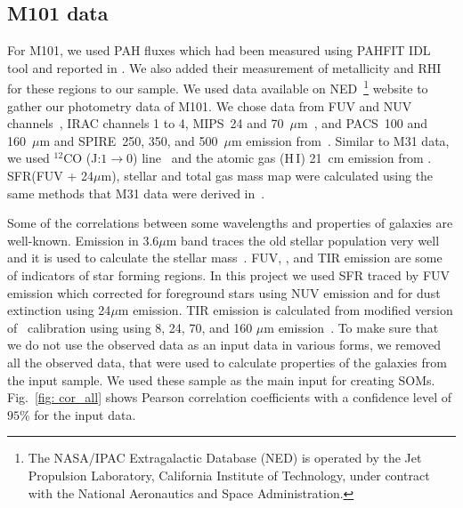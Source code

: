     \subsection{M101 data}
    \label{Sec: data_M101_SOMN} 
     For M101, we used PAH fluxes which had been measured using {\sc PAHFIT IDL} tool and reported in \cite{Gordon08}.
     We also added their measurement of metallicity and RHI for these regions to our sample.
     We used data available on NED~\footnote{The NASA/IPAC Extragalactic Database (NED) is operated by the Jet Propulsion Laboratory, California Institute of Technology, under contract with the National Aeronautics and Space Administration.} website to gather our photometry data of M101. 
     We chose data from \GALEX FUV and NUV channels~\citep{depaz07}, IRAC channels 1 to 4, MIPS~24 and 70~$\mu$m~\cite{Dale09}, and  PACS~100 and 160~$\mu$m and SPIRE~250, 350, and 500~$\mu$m emission from~\cite{Kennicutt11}.
     Similar to M31 data, we used $^{12}$CO (J:$1\rightarrow0$) line~\citep{Helfer03} and the atomic gas (H\,{\sc I}) 21~cm emission from \cite{Walter08}.
     SFR(FUV + 24$\mu$m), stellar and total gas mass map were calculated using the same methods that M31 data were derived in~\cite{Rahmani16}.
     
     Some of the correlations between some wavelengths and properties of galaxies are well-known.
     Emission in 3.6$\mu$m band traces the old stellar population very well~\citep[e.g]{Leitherer99,Smith07a} and it is used to calculate the stellar mass~\citep{Eskew12}.
     FUV, \halpha, and TIR emission are some of indicators of star forming regions.
     In this project we used SFR traced by FUV emission which corrected for foreground stars using NUV emission and for dust extinction using 24$\mu$m emission.
     TIR emission is calculated from modified version of~\cite{Draine07} calibration using using 8, 24, 70, and 160 $\mu$m emission~\citep{Boquien10}.
     To make sure that we do not use the observed data as an input data in various forms, we removed all the observed data, that were used to calculate properties of the galaxies from the input sample.
     We used these sample as the main input for creating SOMs.
     Fig.~\ref{fig: cor_all} shows Pearson correlation coefficients with a confidence level of $95\%$ for the input data. 
     
